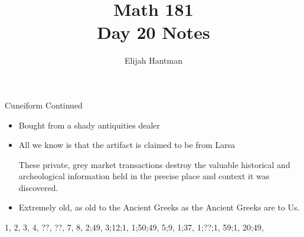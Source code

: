 \documentclass{report}
\title{\Huge{Math 181}\\Day 20 Notes}
\author{\huge{Elijah Hantman}}
\date{}
\begin{document}
\maketitle
\newpage

\begin{description}
    \item {\large Cuneiform Continued} 
        \begin{mdframed}
            \begin{itemize}
                \item Bought from a shady antiquities dealer
                \item All we know is that the artifact is claimed
                    to be from Larsa
                    \begin{mdframed}
                        These private, grey market transactions
                        destroy the valuable historical
                        and archeological information held
                        in the precise place and context
                        it was discovered.
                    \end{mdframed}
                \item Extremely old, as old to the Ancient
                    Greeks as the Ancient Greeks are to
                    Us.
            \end{itemize} 
        \end{mdframed}


        1, 2, 3, 4, ??, ??, 7, 8,
        2;49, 3;12;1, 1;50;49, 5;9, 1;37, 1;??;1, 59;1, 20;49,

\end{description}
\end{document}
